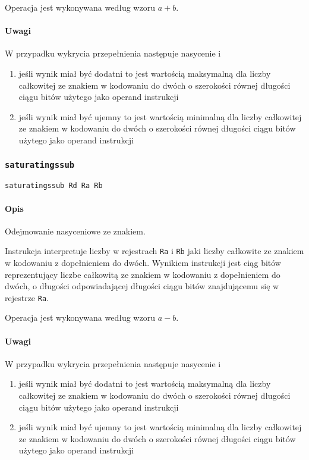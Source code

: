 Operacja jest wykonywana według wzoru $a + b$.

\paragraph*{Uwagi}

W przypadku wykrycia przepełnienia następuje nasycenie i
\begin{enumerate}
\item jeśli wynik miał być dodatni to jest wartością maksymalną dla liczby
    całkowitej ze znakiem w kodowaniu do dwóch o szerokości równej długości
    ciągu bitów użytego jako operand instrukcji
\item jeśli wynik miał być ujemny to jest wartością minimalną dla liczby
    całkowitej ze znakiem w kodowaniu do dwóch o szerokości równej długości
    ciągu bitów użytego jako operand instrukcji
\end{enumerate}

\subsubsection{\texttt{saturatingssub}}

\begin{lstlisting}
saturatingssub Rd Ra Rb
\end{lstlisting}

\paragraph*{Opis} Odejmowanie nasyceniowe ze znakiem.

Instrukcja interpretuje liczby w rejestrach \texttt{Ra} i \texttt{Rb} jaki
liczby całkowite ze znakiem w kodowaniu z dopełnieniem do dwóch. Wynikiem
instrukcji jest ciąg bitów reprezentujący liczbe całkowitą ze znakiem w
kodowaniu z dopełnieniem do dwóch, o długości odpowiadającej długości ciągu
bitów znajdującemu się w rejestrze \texttt{Ra}.

Operacja jest wykonywana według wzoru $a - b$.

\paragraph*{Uwagi}

W przypadku wykrycia przepełnienia następuje nasycenie i
\begin{enumerate}
\item jeśli wynik miał być dodatni to jest wartością maksymalną dla liczby
    całkowitej ze znakiem w kodowaniu do dwóch o szerokości równej długości
    ciągu bitów użytego jako operand instrukcji
\item jeśli wynik miał być ujemny to jest wartością minimalną dla liczby
    całkowitej ze znakiem w kodowaniu do dwóch o szerokości równej długości
    ciągu bitów użytego jako operand instrukcji
\end{enumerate}

